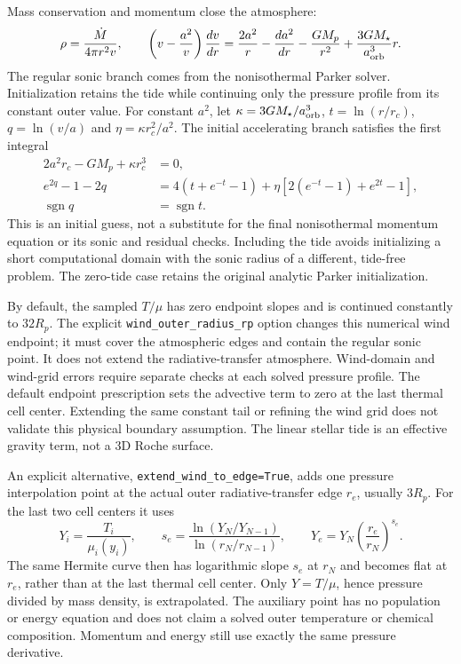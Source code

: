 \documentclass[10pt,a4paper]{article}
\begin{document}
Mass conservation and momentum close the atmosphere:
\begin{equation}
 \rho=\frac{\dot M}{4\pi r^2v},\qquad
 \left(v-\frac{a^2}{v}\right)\frac{dv}{dr}
 =\frac{2a^2}{r}-\frac{da^2}{dr}-\frac{GM_p}{r^2}
                      +\frac{3GM_\star}{a_{\rm orb}^3}r.
 \label{eq:wind}
\end{equation}
The regular sonic branch comes from the nonisothermal Parker solver.
Initialization retains the tide while continuing only the pressure profile
from its constant outer value. For constant $a^2$, let
$\kappa=3GM_\star/a_{\rm orb}^3$, $t=\ln(r/r_c)$,
$q=\ln(v/a)$ and $\eta=\kappa r_c^2/a^2$. The initial accelerating branch
satisfies the first integral
\begin{equation}
 \begin{aligned}
 2a^2r_c-GM_p+\kappa r_c^3&=0,\\
 e^{2q}-1-2q&=4(t+e^{-t}-1)
   +\eta\left[2(e^{-t}-1)+e^{2t}-1\right],\\
 \operatorname{sgn}q&=\operatorname{sgn}t.
 \end{aligned}
 \label{eq:wind_seed}
\end{equation}
This is an initial guess, not a substitute for the final nonisothermal
momentum equation or its sonic and residual checks. Including the tide
avoids initializing a short computational domain with the sonic radius
of a different, tide-free problem. The zero-tide case retains the original
analytic Parker initialization.

By default, the sampled $T/\mu$ has zero endpoint slopes and is
continued constantly to $32R_p$. The explicit
\texttt{wind\_outer\_radius\_rp} option changes this numerical wind endpoint;
it must cover the atmospheric edges and contain the regular sonic point.
It does not extend the radiative-transfer atmosphere. Wind-domain and
wind-grid errors require separate checks at each solved pressure profile. The default endpoint prescription sets
the advective term to zero at
the last thermal cell center. Extending the same constant tail or refining
the wind grid does not validate this physical boundary assumption.
The linear stellar tide is an effective gravity term, not a 3D Roche surface.

An explicit alternative, \texttt{extend\_wind\_to\_edge=True}, adds one
pressure interpolation point at the actual outer radiative-transfer edge
$r_e$, usually $3R_p$. For the last two cell centers it uses
\begin{equation}
 Y_i=\frac{T_i}{\mu_i(y_i)},\qquad
 s_e=\frac{\ln(Y_N/Y_{N-1})}{\ln(r_N/r_{N-1})},\qquad
 Y_e=Y_N\left(\frac{r_e}{r_N}\right)^{s_e}.
 \label{eq:wind_outer_edge}
\end{equation}
The same Hermite curve then has logarithmic slope $s_e$ at $r_N$ and
becomes flat at $r_e$, rather than at the last thermal cell center.
Only $Y=T/\mu$, hence pressure divided by mass density, is extrapolated.
The auxiliary point has no population or energy equation and does not
claim a solved outer temperature or chemical composition. Momentum and
energy still use exactly the same pressure derivative.
\end{document}

